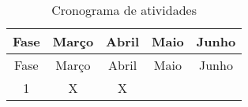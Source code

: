 \begin{longtable}[]{@{}ccccc@{}}
\caption{Cronograma de atividades}\tabularnewline
\toprule
Fase & Março & Abril & Maio & Junho\tabularnewline
\midrule
\endfirsthead
\toprule
Fase & Março & Abril & Maio & Junho\tabularnewline
\midrule
\endhead
1 & X & X & &\tabularnewline
\bottomrule
\end{longtable}

